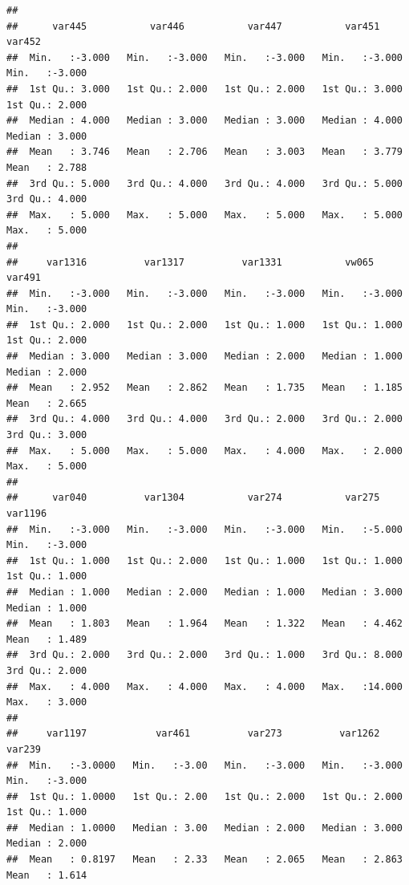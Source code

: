 \documentclass[
]{book}
\begin{document}
\begin{verbatim}
##                                                                                      
##      var445           var446           var447           var451           var452      
##  Min.   :-3.000   Min.   :-3.000   Min.   :-3.000   Min.   :-3.000   Min.   :-3.000  
##  1st Qu.: 3.000   1st Qu.: 2.000   1st Qu.: 2.000   1st Qu.: 3.000   1st Qu.: 2.000  
##  Median : 4.000   Median : 3.000   Median : 3.000   Median : 4.000   Median : 3.000  
##  Mean   : 3.746   Mean   : 2.706   Mean   : 3.003   Mean   : 3.779   Mean   : 2.788  
##  3rd Qu.: 5.000   3rd Qu.: 4.000   3rd Qu.: 4.000   3rd Qu.: 5.000   3rd Qu.: 4.000  
##  Max.   : 5.000   Max.   : 5.000   Max.   : 5.000   Max.   : 5.000   Max.   : 5.000  
##                                                                                      
##     var1316          var1317          var1331           vw065            var491      
##  Min.   :-3.000   Min.   :-3.000   Min.   :-3.000   Min.   :-3.000   Min.   :-3.000  
##  1st Qu.: 2.000   1st Qu.: 2.000   1st Qu.: 1.000   1st Qu.: 1.000   1st Qu.: 2.000  
##  Median : 3.000   Median : 3.000   Median : 2.000   Median : 1.000   Median : 2.000  
##  Mean   : 2.952   Mean   : 2.862   Mean   : 1.735   Mean   : 1.185   Mean   : 2.665  
##  3rd Qu.: 4.000   3rd Qu.: 4.000   3rd Qu.: 2.000   3rd Qu.: 2.000   3rd Qu.: 3.000  
##  Max.   : 5.000   Max.   : 5.000   Max.   : 4.000   Max.   : 2.000   Max.   : 5.000  
##                                                                                      
##      var040          var1304           var274           var275          var1196      
##  Min.   :-3.000   Min.   :-3.000   Min.   :-3.000   Min.   :-5.000   Min.   :-3.000  
##  1st Qu.: 1.000   1st Qu.: 2.000   1st Qu.: 1.000   1st Qu.: 1.000   1st Qu.: 1.000  
##  Median : 1.000   Median : 2.000   Median : 1.000   Median : 3.000   Median : 1.000  
##  Mean   : 1.803   Mean   : 1.964   Mean   : 1.322   Mean   : 4.462   Mean   : 1.489  
##  3rd Qu.: 2.000   3rd Qu.: 2.000   3rd Qu.: 1.000   3rd Qu.: 8.000   3rd Qu.: 2.000  
##  Max.   : 4.000   Max.   : 4.000   Max.   : 4.000   Max.   :14.000   Max.   : 3.000  
##                                                                                      
##     var1197            var461          var273          var1262           var239      
##  Min.   :-3.0000   Min.   :-3.00   Min.   :-3.000   Min.   :-3.000   Min.   :-3.000  
##  1st Qu.: 1.0000   1st Qu.: 2.00   1st Qu.: 2.000   1st Qu.: 2.000   1st Qu.: 1.000  
##  Median : 1.0000   Median : 3.00   Median : 2.000   Median : 3.000   Median : 2.000  
##  Mean   : 0.8197   Mean   : 2.33   Mean   : 2.065   Mean   : 2.863   Mean   : 1.614  

\end{verbatim}
\end{document}
